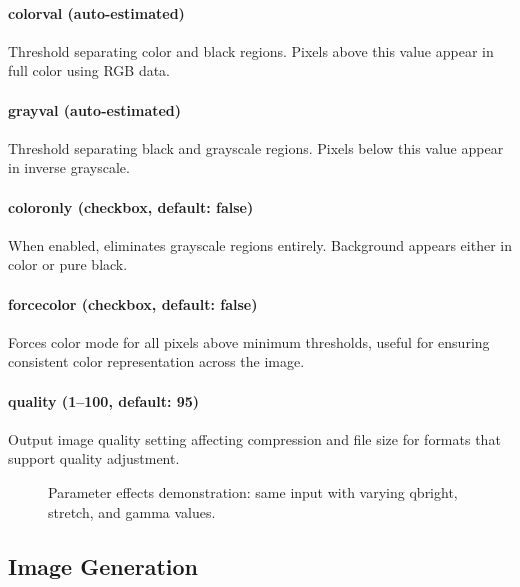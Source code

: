 \documentclass[11pt,a4paper]{article}
\begin{document}
\paragraph{colorval (auto-estimated)}
Threshold separating color and black regions. Pixels above this value
appear in full color using RGB data.

\paragraph{grayval (auto-estimated)}
Threshold separating black and grayscale regions. Pixels below this value
appear in inverse grayscale.

\paragraph{coloronly (checkbox, default: false)}
When enabled, eliminates grayscale regions entirely. Background appears
either in color or pure black.

\paragraph{forcecolor (checkbox, default: false)}
Forces color mode for all pixels above minimum thresholds, useful for
ensuring consistent color representation across the image.

\paragraph{quality (1--100, default: 95)}
Output image quality setting affecting compression and file size for
formats that support quality adjustment.

\begin{figure}[H]
\centering
\caption{Parameter effects demonstration: same input with varying qbright,
stretch, and gamma values.}
\label{fig:parameter-effects}
\end{figure}

\subsection{Image Generation}
\end{document}
